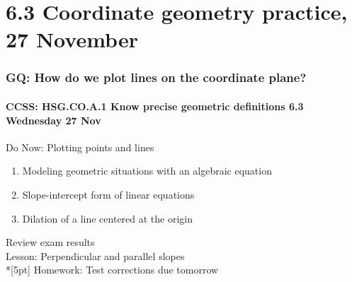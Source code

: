 \documentclass{beamer}
\begin{document}
\section{6.3 Coordinate geometry practice, 27 November}
  \frame
  {
    \frametitle{GQ: How do we plot lines on the coordinate plane?}
    \framesubtitle{CCSS: HSG.CO.A.1 Know precise geometric definitions \hfill \alert{6.3 Wednesday 27 Nov}}

    \begin{block}{Do Now: Plotting points and lines}
    \begin{enumerate}
      \item Modeling geometric situations with an algebraic equation
      \item Slope-intercept form of linear equations
      \item Dilation of a line centered at the origin
    \end{enumerate}
    \end{block}
    Review exam results \\
    Lesson: Perpendicular and parallel slopes \\*[5pt]
    Homework: Test corrections due \alert{tomorrow}
  }
\end{document}
